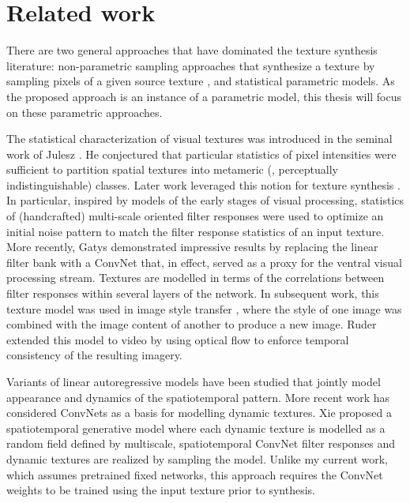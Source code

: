 \chapter{Related work }

There are two general approaches that have dominated the texture
synthesis literature: non-parametric sampling approaches that
synthesize a texture by sampling pixels of a given source texture
\cite{efros1999,kwatra2003graphcut,schodl2000,wei2000}, and 
statistical parametric models.
As the proposed approach is an instance of a parametric model, this thesis 
will focus on these parametric approaches.

The statistical characterization of visual textures was introduced
in the seminal work of Julesz \cite{julesz1962}.
He conjectured that particular statistics of pixel intensities
were sufficient to partition spatial textures into metameric (\ie,
perceptually indistinguishable) classes.
Later work leveraged this notion for texture synthesis
\cite{heeger1995pyramid,portilla2000parametric}.
In particular, inspired by models of the early stages of visual 
processing, statistics of (handcrafted) multi-scale oriented filter 
responses were used to optimize an initial noise pattern 
to match the filter response statistics of an input texture.
More recently, Gatys \etal \cite{gatys2015} demonstrated
impressive results by replacing the linear filter bank with a
ConvNet that, in effect, served as a proxy for the ventral visual
processing stream.
Textures are modelled in terms of the correlations between filter 
responses within several layers of the network.
In subsequent work, this texture model was used in image style
transfer \cite{gatys2016image}, where the style of one image was
combined with the image content of another to produce a new image.
Ruder \etal \cite{ruder2016} extended this model to video by using
optical flow to enforce temporal consistency of the
resulting imagery.

Variants of linear autoregressive models have been studied
\cite{szummer1996,doretto2003} that jointly model appearance and
dynamics of the spatiotemporal pattern.
More recent work has considered ConvNets as a basis for modelling 
dynamic textures.
Xie \etal \cite{xie2017synthesizing} proposed a spatiotemporal
generative model where each dynamic texture is modelled as a random
field defined by multiscale, spatiotemporal ConvNet filter responses
and dynamic textures are realized by sampling the model.
Unlike my current work, which assumes pretrained fixed networks,
this approach requires the ConvNet weights to be trained using the
input texture prior to synthesis.

